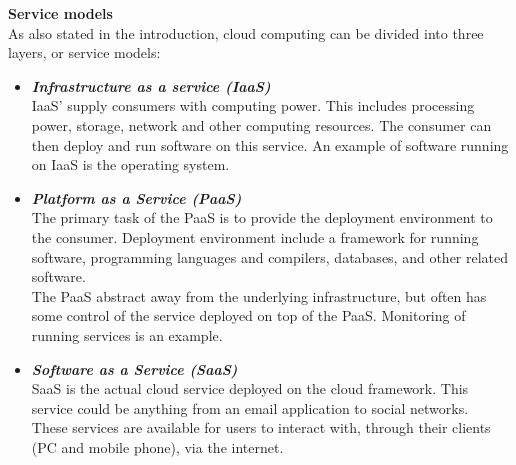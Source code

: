 \documentclass[12pt,a4paper]{article}
\begin{document}
\textbf{Service models}\\
As also stated in the introduction, cloud computing can be divided into three layers, or service models:
\begin{itemize}
\item \textbf{\emph{Infrastructure as a service (IaaS)}} \\
IaaS' supply consumers with computing power. This includes processing power, storage, network and other computing resources. The consumer can then deploy and run software on this service. An example of software running on IaaS is the operating system.

\item \textbf{\emph{Platform as a Service (PaaS)}} \\
The primary task of the PaaS is to provide the deployment environment to the consumer. Deployment environment include a framework for running software, programming languages and compilers, databases, and other related software.\\
The PaaS abstract away from the underlying infrastructure, but often has some control of the service deployed on top of the PaaS. Monitoring of running services is an example.

\item \textbf{\emph{Software as a Service (SaaS)}} \\
SaaS is the actual cloud service deployed on the cloud framework. This service could be anything from an email application to social networks.\\
These services are available for users to interact with, through their clients (PC and mobile phone), via the internet.
\end{itemize}
\end{document}
